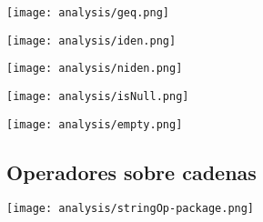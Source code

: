 \begin{multicols}{2}
\begin{center}
\texttt{[image: analysis/geq.png]} 
\end{center}
\columnbreak
\begin{center}
\texttt{[image: analysis/iden.png]} 
\end{center}
\end{multicols}

\begin{multicols}{2}
\begin{center}
\texttt{[image: analysis/niden.png]} 
\end{center}
\columnbreak
\begin{center}
\texttt{[image: analysis/isNull.png]} 
\end{center}
\end{multicols}

\begin{center}
\texttt{[image: analysis/empty.png]} 
\end{center}


\subsection {Operadores sobre cadenas}
\begin{center}
\texttt{[image: analysis/stringOp-package.png]} 
\end{center}


